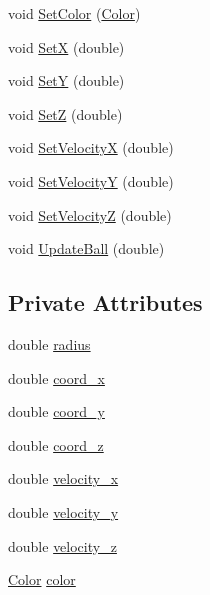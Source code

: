 \begin{DoxyCompactItemize}
void \hyperlink{classBall_a3005173f0433ba7e4a17e3f17e17ad3f}{Set\+Color} (\hyperlink{classColor}{Color})
\item 
void \hyperlink{classBall_ab568ff882cf687755620b05d23fcc0b2}{Set\+X} (double)
\item 
void \hyperlink{classBall_a908bf44a408752a5a57dca7208e88261}{Set\+Y} (double)
\item 
void \hyperlink{classBall_a605a95d9686caa17e94658ebd80134e2}{Set\+Z} (double)
\item 
void \hyperlink{classBall_ac6b233f8bfa2f301639fcc47812a71a5}{Set\+Velocity\+X} (double)
\item 
void \hyperlink{classBall_add36cd0acd3a4cfd20c89fdb5ae57c75}{Set\+Velocity\+Y} (double)
\item 
void \hyperlink{classBall_a070471ba0c171ea46265f37e8c33d353}{Set\+Velocity\+Z} (double)
\item 
void \hyperlink{classBall_acad1151201f428ab9d04115fe6e5fce6}{Update\+Ball} (double)
\end{DoxyCompactItemize}
\subsection*{Private Attributes}
\begin{DoxyCompactItemize}
\item 
double \hyperlink{classBall_ae75638f44296592c288bf7c87590fee0}{radius}
\item 
double \hyperlink{classBall_a6d5a7aacffad1248080398f2d6540fe0}{coord\+\_\+x}
\item 
double \hyperlink{classBall_ad65b08abc2b3d8ab7e51f0dc41b6ea08}{coord\+\_\+y}
\item 
double \hyperlink{classBall_ab5297ae361c4310f2aa84c1b602293a0}{coord\+\_\+z}
\item 
double \hyperlink{classBall_a6b84a62eb0d13d592472f9419151c25b}{velocity\+\_\+x}
\item 
double \hyperlink{classBall_aeadbe78353c1ea96e9cc0756ff7613fa}{velocity\+\_\+y}
\item 
double \hyperlink{classBall_ae339b0f1007bb7e7e55bb60c356c889b}{velocity\+\_\+z}
\item 
\hyperlink{classColor}{Color} \hyperlink{classBall_aaf859de645927ea78ef1defae263ba09}{color}
\end{DoxyCompactItemize}


